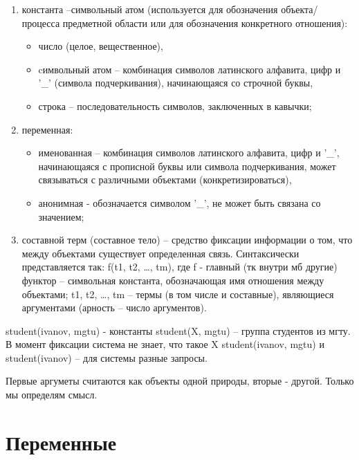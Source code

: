 \documentclass[12pt]{report}
\begin{document}
\begin{enumerate}
	\item константа --символьный атом (используется для обозначения объекта/процесса предметной области или для обозначения конкретного отношения): 
	\begin{itemize}
		\item число (целое, вещественное),
		\item cимвольный атом -- комбинация символов латинского алфавита, цифр и ’\_’ (символа подчеркивания), начинающаяся со строчной буквы,
		\item строка -- последовательность символов, заключенных в кавычки;
	\end{itemize}
	\item переменная:
	\begin{itemize}
		\item именованная -- комбинация символов латинского алфавита, цифр и ’\_’, начинающаяся с прописной буквы или символа подчеркивания, может связываться с различными объектами (конкретизироваться),
		\item анонимная  - обозначается символом ’\_’, не может быть связана со значением;
	\end{itemize}
	\item составной терм (составное тело) -- средство фиксации информации о том, что между объектами существует определенная связь. Синтаксически представляется так: f(t1, t2, …, tm), где f -  главный (тк внутри мб другие) функтор -- символьная константа, обозначающая имя отношения между объектами; t1, t2, …, tm – термы (в том  числе  и составные), являющиеся аргументами (арность -- число аргументов).
\end{enumerate}



student(ivanov, mgtu) - константы
student(X, mgtu) -- группа студентов из мгту. В момент фиксации система не знает, что такое X
student(ivanov, mgtu) и student(ivanov) -- для системы разные запросы.

Первые аргуметы считаются как объекты одной природы, вторые - другой. Только мы определям смысл.









\section{Переменные}
\end{document}

